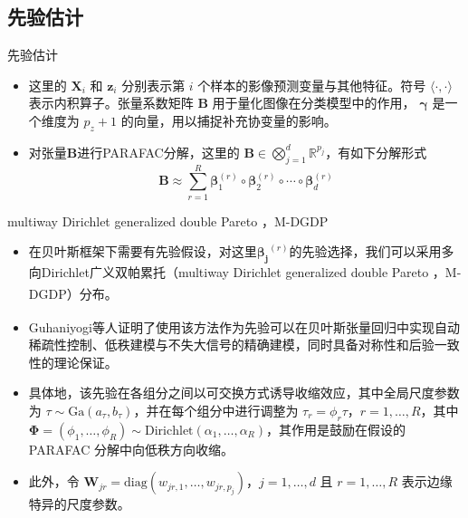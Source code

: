 \documentclass{beamer}
\newcommand{\supcite}[1]{\textsuperscript{\cite{#1}}}
\begin{document}
	\subsection{先验估计}
	\begin{frame}{先验估计}
		\begin{itemize}
			\begin{exampleblock}{线性预测模型}
				\begin{equation}
					f_{i} = \langle \mathbf{X}_{i}, \bm{B}\rangle + \mathbf{z}_{i}^{\prime}\bm{\gamma}
				\end{equation}
			\end{exampleblock}
			\item 这里的 \( \mathbf{X}_i \) 和 \( \mathbf{z}_i \) 分别表示第 \( i \) 个样本的影像预测变量与其他特征。符号 \( \langle \cdot, \cdot \rangle \) 表示内积算子。张量系数矩阵 \( \bm{B} \) 用于量化图像在分类模型中的作用，  
			\( \bm{\gamma} \) 是一个维度为 \( p_z + 1 \) 的向量，用以捕捉补充协变量的影响。
			\item 对张量$\bm{B}$进行PARAFAC分解，这里的
			$\bm{B} \in \bigotimes_{j=1}^{d} \mathbb{R}^{p_j}$，有如下分解形式
			\begin{equation}
				\bm{B} \approx \sum_{r=1}^{R} \bm{\beta}_1^{(r)} \circ \bm{\beta}_2^{(r)} \circ \cdots \circ \bm{\beta}_d^{(r)}
				\label{Equation:PARAFAC}
			\end{equation}
		\end{itemize}	
	\end{frame}
	\begin{frame}{multiway Dirichlet generalized double Pareto ，M-DGDP}
		\begin{itemize}
			\item 在贝叶斯框架下需要有先验假设，对这里$\bm{\beta_{j}}^{(r)}$的先验选择，我们可以采用多向Dirichlet广义双帕累托（multiway Dirichlet generalized double Pareto ，M-DGDP）分布\supcite{e}。
			\item Guhaniyogi等人证明了\supcite{e}使用该方法作为先验可以在贝叶斯张量回归中实现自动稀疏性控制、低秩建模与不失大信号的精确建模，同时具备对称性和后验一致性的理论保证。
			\item 具体地，该先验在各组分之间以可交换方式诱导收缩效应，其中全局尺度参数为 \( \tau \sim \mathrm{Ga}(a_\tau, b_\tau) \)，并在每个组分中进行调整为 \( \tau_r = \phi_r \tau \)，\( r = 1, \ldots, R \)，其中 \( \bm{\Phi} = (\phi_1, \ldots, \phi_R) \sim \mathrm{Dirichlet}(\alpha_1, \ldots, \alpha_R) \)，其作用是鼓励在假设的 PARAFAC 分解中向低秩方向收缩。
			\item 此外，令 \( \bm{W}_{jr} = \mathrm{diag}(w_{jr,1}, \ldots, w_{jr, p_j}) \)，\( j = 1, \ldots, d \) 且 \( r = 1, \ldots, R \) 表示边缘特异的尺度参数。
		\end{itemize}
	\end{frame}
\end{document}
